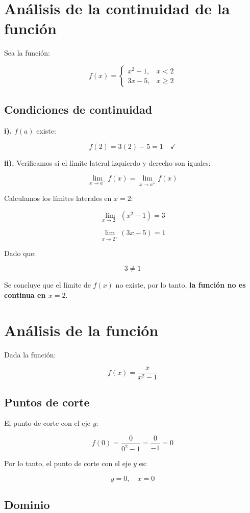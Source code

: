 \section*{Análisis de la continuidad de la función}

Sea la función:

\[
f(x) =
\begin{cases} 
x^2 - 1, & x < 2 \\
3x - 5, & x \geq 2
\end{cases}
\]

\subsection*{Condiciones de continuidad}

\textbf{i).} $f(a)$ existe:

\[
f(2) = 3(2) - 5 = 1 \quad \checkmark
\]

\textbf{ii).} Verificamos si el límite lateral izquierdo y derecho son iguales:

\[
\lim_{x \to a^-} f(x) = \lim_{x \to a^+} f(x)
\]

Calculamos los límites laterales en $x = 2$:

\[
\lim_{x \to 2^-} (x^2 -1) = 3
\]

\[
\lim_{x \to 2^+} (3x -5) = 1
\]

Dado que:

\[
3 \neq 1
\]

Se concluye que el límite de $f(x)$ no existe, por lo tanto, \textbf{la función no es continua en $x=2$}. 

\section*{Análisis de la función}

Dada la función:

\[
f(x) = \frac{x}{x^2 - 1}
\]

\subsection*{Puntos de corte}

El punto de corte con el eje $y$:

\[
f(0) = \frac{0}{0^2 - 1} = \frac{0}{-1} = 0
\]

Por lo tanto, el punto de corte con el eje $y$ es:

\[
y = 0, \quad x = 0
\]

\subsection*{Dominio}

